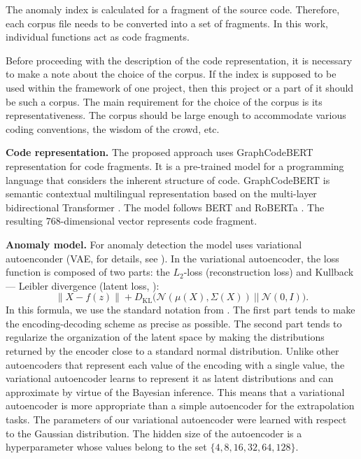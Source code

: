 \documentclass[10pt,conference]{IEEEtran}
\newcommand{\norm}[1]{\left\lVert#1\right\rVert}
\begin{document}
The anomaly index is calculated for a fragment of the source code.
Therefore, each corpus file needs to be converted into a set of fragments.
In this work, individual functions act as code fragments.

Before proceeding with the description of the code representation,
 it is necessary to make a note about the choice of the corpus.
If the index is supposed to be used within the framework of one project, then this project or a part of it should be such a corpus.
The main requirement for the choice of the corpus is its representativeness.
The corpus should be large enough to accommodate various coding conventions, the wisdom of the crowd, etc.


{\bf Code representation.}
The proposed approach uses GraphCodeBERT \cite{GuoEtAl2021} representation for code fragments.
It is a pre-trained model for a programming language that considers the inherent structure of code.
GraphCodeBERT is semantic contextual multilingual representation based on the multi-layer bidirectional Transformer \cite{VaswaniEtAl2017}.
The model follows BERT \cite{DevlinEtAl2019} and RoBERTa \cite{LiuEtAl2019}.
The resulting $768$-dimensional vector represents code fragment.


{\bf Anomaly model.}
For anomaly detection the model uses variational autoenconder (VAE, for details, see \cite{KingmaWelling2014, RezendeEtAl2014}).
In the variational autoencoder, the loss function is composed of two parts:
 the $L_2$-loss (reconstruction loss) and Kullback --- Leibler divergence (latent loss, \cite[Appendix B]{KingmaWelling2014}):
$$\norm{X - f(z)} + D_{\mathrm{KL}}\big(\mathcal{N}(\mu(X), \Sigma(X) ) ~||~ \mathcal{N}(0, I)\big).$$
In this formula, we use the standard notation from \cite{KingmaWelling2014}.
The first part tends to make the encoding-decoding scheme as precise as possible.
The second part tends to regularize the organization of the latent space by making the distributions
 returned by the encoder close to a standard normal distribution.
Unlike other autoencoders that represent each value of the encoding with a single value,
 the variational autoencoder learns to represent it as latent distributions
 and can approximate by virtue of the Bayesian inference.
This means that a variational autoencoder is more appropriate than a simple autoencoder for the extrapolation tasks.
The parameters of our variational autoencoder were learned with respect to the Gaussian distribution.
The hidden size of the autoencoder is a hyperparameter whose values belong to the set
 $\{4, 8, 16, 32, 64, 128\}$.
\end{document}
